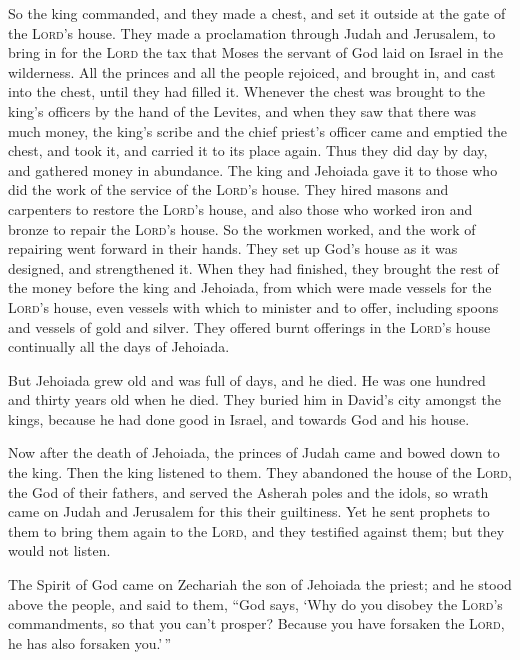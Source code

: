  So the king commanded, and they made a chest, and set it
outside at the gate of the \textsc{Lord}'s house.  They
made a proclamation through Judah and Jerusalem, to bring in for the
\textsc{Lord} the tax that Moses the servant of God laid on Israel in
the wilderness.  All the princes and all the people
rejoiced, and brought in, and cast into the chest, until they had filled
it.  Whenever the chest was brought to the king's
officers by the hand of the Levites, and when they saw that there was
much money, the king's scribe and the chief priest's officer came and
emptied the chest, and took it, and carried it to its place again. Thus
they did day by day, and gathered money in abundance. 
The king and Jehoiada gave it to those who did the work of the service
of the \textsc{Lord}'s house. They hired masons and carpenters to
restore the \textsc{Lord}'s house, and also those who worked iron and
bronze to repair the \textsc{Lord}'s house.  So the
workmen worked, and the work of repairing went forward in their hands.
They set up God's house as it was designed, and strengthened it.
 When they had finished, they brought the rest of the
money before the king and Jehoiada, from which were made vessels for the
\textsc{Lord}'s house, even vessels with which to minister and to offer,
including spoons and vessels of gold and silver. They offered burnt
offerings in the \textsc{Lord}'s house continually all the days of
Jehoiada.

 But Jehoiada grew old and was full of days, and he died.
He was one hundred and thirty years old when he died. 
They buried him in David's city amongst the kings, because he had done
good in Israel, and towards God and his house.

 Now after the death of Jehoiada, the princes of Judah
came and bowed down to the king. Then the king listened to them.
 They abandoned the house of the \textsc{Lord}, the God
of their fathers, and served the Asherah poles and the idols, so wrath
came on Judah and Jerusalem for this their guiltiness. 
Yet he sent prophets to them to bring them again to the \textsc{Lord},
and they testified against them; but they would not listen.

 The Spirit of God came on Zechariah the son of Jehoiada
the priest; and he stood above the people, and said to them, ``God says,
`Why do you disobey the \textsc{Lord}'s commandments, so that you can't
prosper? Because you have forsaken the \textsc{Lord}, he has also
forsaken you.'\,''

